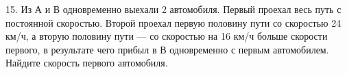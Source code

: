 15. Из А и В одновременно выехали 2 автомобиля. Первый проехал весь путь с постоянной скоростью. Второй проехал первую половину пути со скоростью 24 км/ч, а вторую половину пути --- со скоростью на 16 км/ч больше скорости первого, в результате чего прибыл в В одновременно с первым автомобилем. Найдите скорость первого автомобиля.\\

